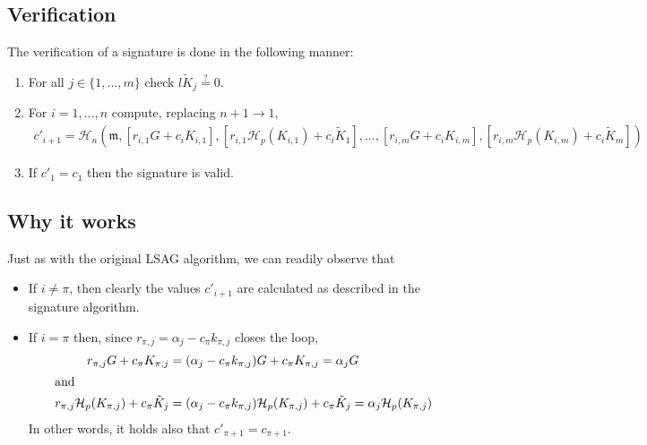 \subsection*{Verification}

The verification of a signature is done in the following manner:

\begin{enumerate}
    \item For all $j \in \{1,...,m\}$ check $l \tilde{K}_j \stackrel{?}{=} 0$.
	\item  For \(i = 1, ..., n\) compute, replacing \(n + 1 \rightarrow 1\),\vspace{.2cm}
	\begin{align*}
	c'_{i+1} = \mathcal{H}_n(\mathfrak{m}, [r_{i, 1} G + c_i K_{i, 1}], [r_{i, 1} \mathcal{H}_p(K_{i, 1}) + c_i \tilde{K}_1], 
	..., [r_{i, m} G + c_i K_{i, m}], [r_{i, m} \mathcal{H}_p(K_{i, m}) + c_i \tilde{K}_m]) 
	\end{align*}
	
	\item If \(c'_1 = c_1\) then the signature is valid.
\end{enumerate}


\subsection*{Why it works}

Just as with the original LSAG algorithm, we can readily observe that

\begin{itemize}

\item If \(i \ne \pi \), then clearly the values \(c'_{i + 1}\) are calculated as described in the signature algorithm.

\item If \(i = \pi\) then, since \(r_{\pi, j} = \alpha_j - c_\pi k_{\pi, j} \) closes the loop,\\
\begin{alignat*}{6}  
  r_{\pi, j} G + c_\pi K_{\pi,j} &= (\alpha_j - c_\pi k_{\pi, j}) G + c_\pi K_{\pi,j} = \alpha_j G \\  
    \intertext{and}
  r_{\pi, j} \mathcal{H}_p(K_{\pi, j}) + c_\pi \tilde{K}_j &= (\alpha_j - c_\pi k_{\pi, j}) \mathcal{H}_p(K_{\pi, j}) + c_\pi \tilde{K}_j = \alpha_j \mathcal{H}_p(K_{\pi, j})\\ 
\end{alignat*}
   In other words, it holds also that \(c'_{\pi + 1} = c_{\pi+1}\).

\end{itemize}


